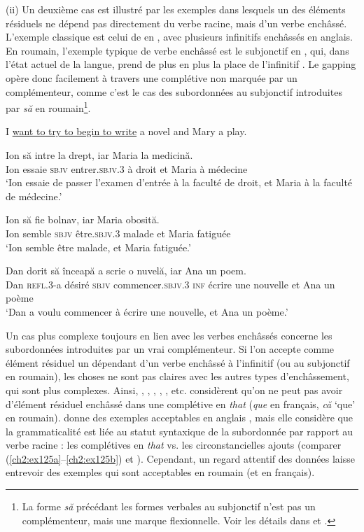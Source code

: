 (ii) Un deuxième cas est illustré par les exemples dans lesquels un des éléments résiduels ne dépend pas directement du verbe racine, mais d’un verbe enchâssé. L’exemple classique est celui de \citet{Ross1970} en , avec plusieurs infinitifs enchâssés en anglais. En roumain, l’exemple typique de verbe enchâssé est le subjonctif en , qui, dans l’état actuel de la langue, prend de plus en plus la place de l’infinitif \citep[392]{GALR2005}. Le gapping opère donc facilement à travers une complétive non marquée par un complémenteur, comme c’est le cas des subordonnées au subjonctif introduites par \textit{să} en roumain\footnote{
 La forme \textit{să} précédant les formes verbales au subjonctif n’est pas un complémenteur, mais une marque flexionnelle. Voir les détails dans \citet{Barbu1999} et \citet[chapitre 1]{Bilbiie2011}.}.

\ea \label{ch2:ex123}
I \uline{want to try to begin to write} a novel and Mary a play. \citep[250]{Ross1970}
\z

\ea \label{ch2:ex124}
\ea
\gll Ion    să  intre  la  drept,  iar  Maria  la  medicină.\\
Ion  essaie  \textsc{sbjv}  entrer.\textsc{sbjv.3} à  droit  et  Maria  à  médecine\\
\glt  ‘Ion essaie de passer l’examen d’entrée à la faculté de droit, et Maria à la faculté de médecine.’  

\ex  
\gll Ion    să  fie  bolnav,  iar  Maria  obosită.\\
Ion  semble  \textsc{sbjv}  être.\textsc{sbjv.3} malade  et  Maria  fatiguée\\
\glt  ‘Ion semble être malade, et Maria fatiguée.’

\ex  
\gll Dan    dorit  să  înceapă  a  scrie  o  nuvelă,  iar  Ana un poem.\\
Dan  \textsc{refl.3}{}-a  désiré  \textsc{sbjv}  commencer.\textsc{sbjv.3}  \textsc{inf}  écrire  une  nouvelle  et  Ana un  poème\\
\glt  ‘Dan a voulu commencer à écrire une nouvelle, et Ana un poème.’
\z
\z

Un cas plus complexe toujours en lien avec les verbes enchâssés concerne les subordonnées introduites par un vrai complémenteur. Si l’on accepte comme élément résiduel un dépendant d’un verbe enchâssé à l’infinitif (ou au subjonctif en roumain), les choses ne sont pas claires avec les autres types d’enchâssement, qui sont plus complexes. Ainsi, \citet{Koutsoudas1971}, \citet{Hankamer1979}, \citet{Wilder1994}, \citet{Johnson1996/2004}, \citet{Williams1997}, etc. considèrent qu’on ne peut pas avoir d’élément résiduel enchâssé dans une complétive en \textit{that} (\textit{que} en français, \textit{că} ‘que’ en roumain). \citet{Gardent1991} donne des exemples acceptables en anglais , mais elle considère que la grammaticalité est liée au statut syntaxique de la subordonnée par rapport au verbe racine : les complétives en \textit{that} vs. les circonstancielles ajouts (comparer (\ref{ch2:ex125a}--\ref{ch2:ex125b}) et ). Cependant, un regard attentif des données laisse entrevoir des exemples qui sont acceptables en roumain (et en français).    

